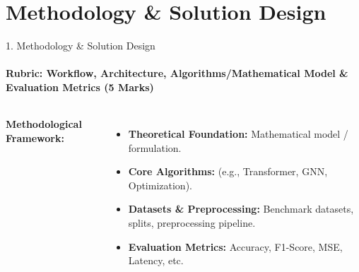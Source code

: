\documentclass[aspectratio=169, 11pt]{beamer}
\begin{document}
\section{Methodology \& Solution Design}
\begin{frame}{1. Methodology \& Solution Design}
    \framesubtitle{Rubric: Workflow, Architecture, Algorithms/Mathematical Model \& Evaluation Metrics (5 Marks)}
    \begin{columns}
        \textbf{Methodological Framework:}
        \begin{itemize}
            \item \textbf{Theoretical Foundation:} Mathematical model / formulation.
            \item \textbf{Core Algorithms:} (e.g., Transformer, GNN, Optimization).
            \item \textbf{Datasets \& Preprocessing:} Benchmark datasets, splits, preprocessing pipeline.
            \item \textbf{Evaluation Metrics:} Accuracy, F1-Score, MSE, Latency, etc.
        \end{itemize}

        \centering
    \end{columns}
\end{frame}

\end{document}
